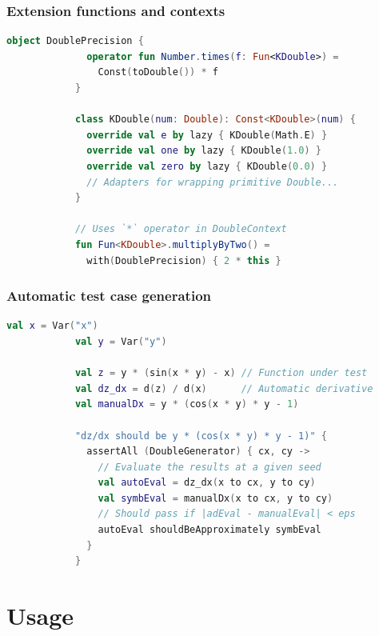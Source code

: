 \documentclass{beamer}
\begin{document}
    \begin{frame}[fragile]
        \frametitle{Extension functions and contexts}
        \begin{lstlisting}[language=Kotlin, gobble=12]
            object DoublePrecision {
              operator fun Number.times(f: Fun<KDouble>) =
                Const(toDouble()) * f
            }

            class KDouble(num: Double): Const<KDouble>(num) {
              override val e by lazy { KDouble(Math.E) }
              override val one by lazy { KDouble(1.0) }
              override val zero by lazy { KDouble(0.0) }
              // Adapters for wrapping primitive Double...
            }

            // Uses `*` operator in DoubleContext
            fun Fun<KDouble>.multiplyByTwo() =
              with(DoublePrecision) { 2 * this }
        \end{lstlisting}
    \end{frame}

    \begin{frame}[fragile]
        \frametitle{Automatic test case generation}
        \begin{lstlisting}[language=Kotlin, gobble=12]
            val x = Var("x")
            val y = Var("y")

            val z = y * (sin(x * y) - x) // Function under test
            val dz_dx = d(z) / d(x)      // Automatic derivative
            val manualDx = y * (cos(x * y) * y - 1)

            "dz/dx should be y * (cos(x * y) * y - 1)" {
              assertAll (DoubleGenerator) { cx, cy ->
                // Evaluate the results at a given seed
                val autoEval = dz_dx(x to cx, y to cy)
                val symbEval = manualDx(x to cx, y to cy)
                // Should pass if |adEval - manualEval| < eps
                autoEval shouldBeApproximately symbEval
              }
            }
        \end{lstlisting}
    \end{frame}

    \section{Usage}\label{sec:fourth-section}
\end{document}
